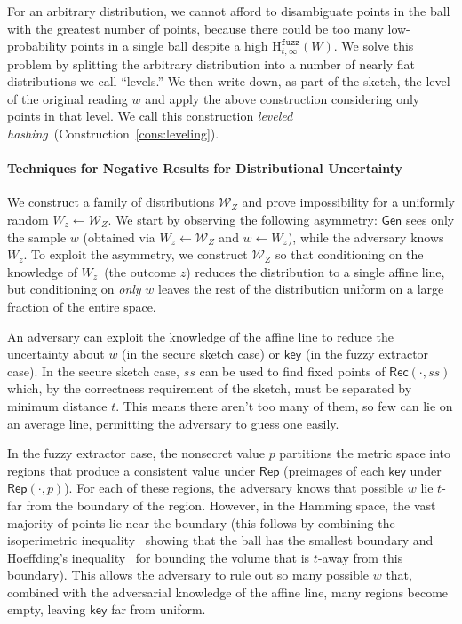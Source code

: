 \documentclass[11pt]{article}
\newcommand{\consref}[1]{\mbox{Construction~\ref{#1}}}
\newcommand{\class}[1]{{\ensuremath{\mathsf{#1}}}}
\newcommand{\key}{\ensuremath{\class{key}}\xspace}
\newcommand{\gen}{\ensuremath{\class{Gen}}\xspace}
\newcommand{\rep}{\ensuremath{\class{Rep}}\xspace}
\newcommand{\rec}{\ensuremath{\class{Rec}}\xspace}
\newcommand{\Hfuzz}{\mathrm{H}^{\mathtt{fuzz}}_{t,\infty}}
\begin{document}
For an arbitrary distribution, we cannot afford to disambiguate points in the ball with the greatest number of points, because there could be too many low-probability points in a single ball despite a high $\Hfuzz(W)$.  We solve this problem by splitting the arbitrary distribution into a number of nearly flat distributions we call ``levels.''  We then write down, as part of the sketch, the level of the original reading $w$ and apply the above construction considering only points in that level.  We call this construction \emph{leveled hashing}~(\consref{cons:leveling}).

\paragraph{Techniques for Negative Results for Distributional Uncertainty}
We construct a family of distributions $\mathcal{W}_Z$ and prove impossibility for a uniformly random $W_z \leftarrow \mathcal{W}_Z$.
We start by observing the following asymmetry: $\gen$  sees only the sample $w$ (obtained via $W_z\leftarrow \mathcal{W}_Z$ and $w\leftarrow W_z$), while
the adversary knows $W_z$.   To exploit the asymmetry, we construct
$\mathcal{W}_Z$ so that conditioning on the knowledge of $W_z$~(the
outcome $z$) reduces the distribution to a single affine line, but
conditioning on \emph{only} $w$ leaves the rest of the distribution uniform on a large fraction of the entire space.

An adversary can exploit the knowledge of the affine line to reduce the uncertainty about $w$ (in the secure sketch case) or $\key$ (in the fuzzy extractor case). 
In the secure sketch case, $ss$ can be used to find fixed points of $\rec(\cdot, ss)$ which, by the correctness requirement of the sketch, must be separated by minimum distance $t$. This means there aren't too many of them, so few can lie on an average line, permitting the adversary to guess one easily.

In the fuzzy extractor case, the nonsecret value $p$ partitions the metric space into regions that produce a consistent value under $\rep$ (preimages of each $\key$ under $\rep(\cdot, p)$).  For each of these regions, the adversary knows that possible $w$ lie $t$-far from the boundary of the region.  However, in the Hamming space, the vast majority of points lie near the boundary (this follows by combining the isoperimetric inequality~\cite{harper1966optimal} showing that the ball has the smallest boundary and Hoeffding's inequality~\cite{hoeffding1963probability} for bounding the volume that is $t$-away from this boundary).  This allows the adversary to rule out so many possible $w$ that, combined with the adversarial knowledge of the affine line, many regions become empty, leaving $\key$ far from uniform.
\end{document}
